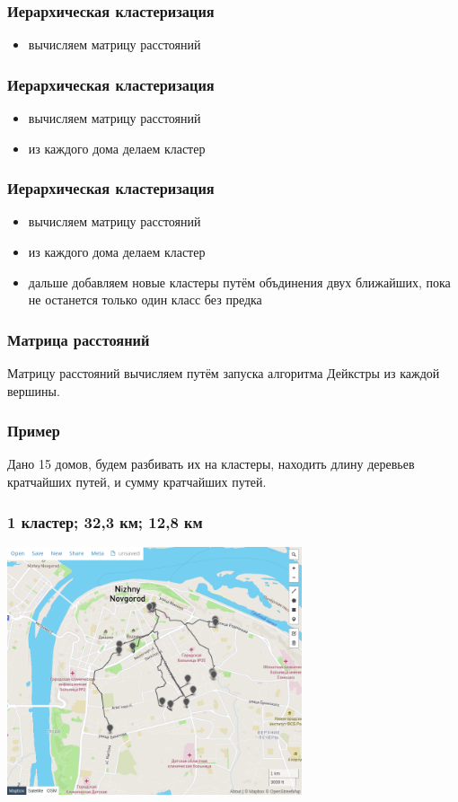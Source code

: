 \documentclass{beamer}
\begin{document}
\begin{frame}
	\frametitle{Иерархическая кластеризация}
	\begin{itemize}
		\item вычисляем матрицу расстояний
	\end{itemize}
\end{frame}

\begin{frame}
	\frametitle{Иерархическая кластеризация}
	\begin{itemize}
		\item вычисляем матрицу расстояний
		\item из каждого дома делаем кластер
	\end{itemize}
\end{frame}

\begin{frame}
	\frametitle{Иерархическая кластеризация}
	\begin{itemize}
		\item вычисляем матрицу расстояний
		\item из каждого дома делаем кластер
		\item дальше добавляем новые кластеры путём объдинения двух ближайших, пока не останется только один класс без предка
	\end{itemize}
\end{frame}

\begin{frame}
	\frametitle{Матрица расстояний}
	Матрицу расстояний вычисляем путём запуска алгоритма Дейкстры из каждой вершины.
\end{frame}

\begin{frame}
	\frametitle{Пример}
	Дано 15 домов, будем разбивать их на кластеры, находить длину деревьев кратчайших путей, и сумму кратчайших путей.

\end{frame}

\begin{frame}
	\frametitle{1 кластер; 32,3 км; 12,8 км}
	\centering
	\includegraphics[width=0.65\textwidth]{k1}
\end{frame}
\end{document}
